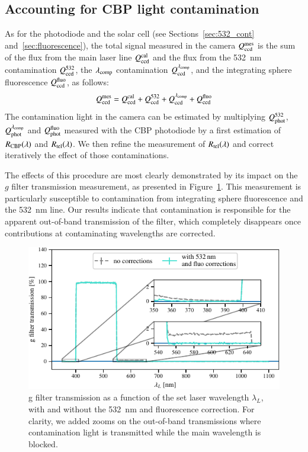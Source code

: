 \subsection{Accounting for CBP light contamination}\label{sec:sd_contaminations}

As for the photodiode and the solar cell (see Sections~\ref{sec:532_cont} and~\ref{sec:fluorescence}), the total signal measured in the \SD camera $Q_{\mathrm{ccd}}^{\mathrm{mes}}$ is the sum of the flux from the main laser line $Q_{\mathrm{ccd}}^{\mathrm{cal}}$ and the flux from the \SI{532}{\nm} contamination $Q_{\mathrm{ccd}}^{532}$, the $\lambda_{\rm comp}$ contamination $Q_{\mathrm{ccd}}^{\lambda_{\rm comp}}$, and the integrating sphere fluorescence $Q_{\mathrm{ccd}}^{\mathrm{fluo}}$, as follows:
\begin{equation}
    Q_{\mathrm{ccd}}^{\mathrm{mes}} = Q_{\mathrm{ccd}}^{\mathrm{cal}} + Q_{\mathrm{ccd}}^{532} + Q_{\mathrm{ccd}}^{\lambda_{\rm comp}} + Q_{\mathrm{ccd}}^{\mathrm{fluo}}
    \label{eq:qccd_mes}
\end{equation}
The contamination light in the \SD camera can be estimated by multiplying $Q_{\mathrm{phot}}^{532}$, $Q_{\mathrm{phot}}^{\lambda_{\rm comp}}$ and $Q_{\mathrm{phot}}^{\mathrm{fluo}}$ measured with the CBP photodiode by a first estimation of $R_{\mathrm{CBP}}(\lambda)$ and $R_{\mathrm{tel}}(\lambda)$. We then refine the measurement of $R_{\mathrm{tel}}(\lambda)$ and correct iteratively the effect of those contaminations.

The effects of this procedure are most clearly demonstrated by its impact on the \SD $g$ filter transmission measurement, as presented in Figure~\ref{fig:g_filter_532}. This measurement is particularly susceptible to contamination from integrating sphere fluorescence and the \SI{532}{\nano\meter} line. Our results indicate that contamination is responsible for the apparent out-of-band transmission of the filter, which completely disappears once contributions at contaminating wavelengths are corrected.

\begin{figure}[h]
    \centering
    \includegraphics[width=\columnwidth]{fig/g_filter_532.pdf}
    \caption{\SD g filter transmission as a function of the set laser wavelength $\lambda_L$, with and without the \SI{532}{\nm} and fluorescence correction. For clarity, we added zooms on the out-of-band transmissions where contamination light is transmitted while the main wavelength is blocked.}
    \label{fig:g_filter_532}
\end{figure}


